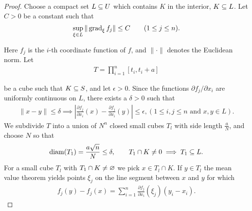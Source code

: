 \begin{proof}
  Choose a compact set $L\subseteq U$ which contains $K$ in the interior, $K\subseteq L$. Let 
  $C>0$ be a constant such that 
  \begin{align}\label{eq:11-4}
    \sup_{\xi\in L}\|\operatorname{grad}_\xi f_j\| \leq C\qquad (1\le j \le n).
  \end{align}

  Here $f_j$ is the $i$-th coordinate function of $f$, and $\|\cdot\|$ denotes the Euclidean norm.
  Let 
  \begin{align*}
    T = \prod_{i=1}^n [t_i, t_i + a]
  \end{align*}

  be a cube such that $K\subseteq S$, and let $\epsilon>0$. Since the functions $\partial f_j/\partial x_i$ 
  are uniformly continuous on $L$, there exists a $\delta >0$ such that
  \begin{align}\label{eq:11-5}
    \|x-y\|\le \delta \implies 
    \left|\frac{\partial f_j }{\partial x_i }(x) - \frac{\partial f_j }{\partial x_i}(y)\right|\le \epsilon,
    (1\le i,j\le n \text{ and } x, y\in L).
  \end{align}
  We subdivide $T$ into a union of $N^n$ closed small cubes $T_l$ with side length $\frac aN$,
  and choose $N$ so that
  \begin{align}\label{eq:11-6}
    \mathrm{diam}(T_1) = \frac{a\sqrt{n}}{N}\le \delta, \qquad T_1\cap K \neq 0\implies T_1\subseteq L.
  \end{align}
  For a small cube $T_l$ with $T_1\cap K\neq \varnothing$ we pick $x\in T_l\cap K$. If $y\in T_l$ the 
  mean value theorem yields points $\xi_j$ on the line segment between $x$ and $y$ for which
  \begin{align}\label{eq:11-7}
    f_j(y) - f_j(x) 
    = \sum_{i=1}^{n }{\frac{\partial f_j }{\partial x_i }(\xi_j)(y_i - x_i)}.
  \end{align}


\end{proof}
